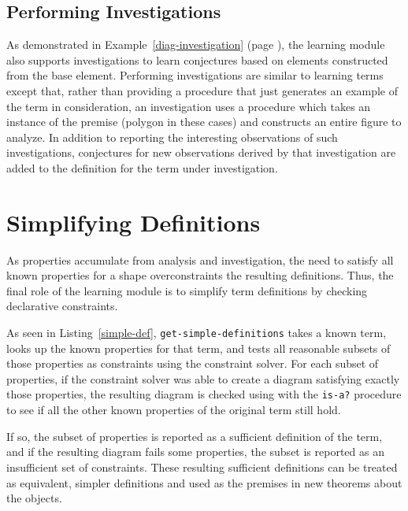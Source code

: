 \subsection{Performing Investigations}

As demonstrated in Example~\ref{diag-investigation} (page
\pageref{diag-investigation}), the learning module also supports
investigations to learn conjectures based on elements constructed from
the base element.  Performing investigations are similar to learning
terms except that, rather than providing a procedure that just
generates an example of the term in consideration, an investigation
uses a procedure which takes an instance of the premise (polygon in
these cases) and constructs an entire figure to analyze. In addition
to reporting the interesting observations of such investigations,
conjectures for new observations derived by that investigation are
added to the definition for the term under investigation.

\section{Simplifying Definitions}

As properties accumulate from analysis and investigation, the need to
satisfy all known properties for a shape overconstraints the resulting
definitions. Thus, the final role of the learning module is to
simplify term definitions by checking declarative constraints.

As seen in Listing~\ref{simple-def}, \texttt{get-simple-definitions}
takes a known term, looks up the known properties for that term, and
tests all reasonable subsets of those properties as constraints using
the constraint solver. For each subset of properties, if the
constraint solver was able to create a diagram satisfying exactly
those properties, the resulting diagram is checked using with the
\texttt{is-a?} procedure to see if all the other known properties of
the original term still hold.

If so, the subset of properties is reported as a sufficient definition
of the term, and if the resulting diagram fails some properties, the
subset is reported as an insufficient set of constraints. These
resulting sufficient definitions can be treated as equivalent, simpler
definitions and used as the premises in new theorems about the
objects.

